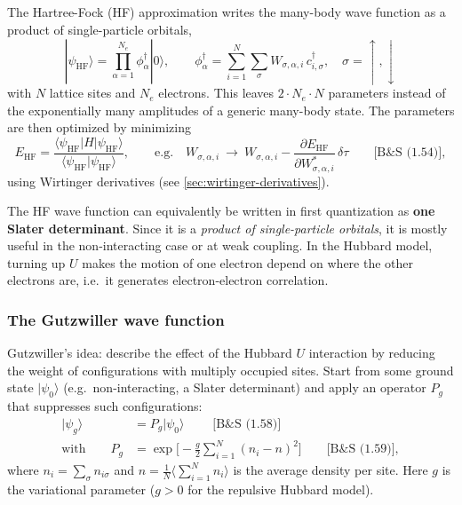 \documentclass[../../main.tex]{subfiles}
\begin{document}
The Hartree-Fock (HF) approximation writes the many-body wave function as a
product of single-particle orbitals,
\begin{equation}
\boxed{\;
|\psi_{\mathrm{HF}}\rangle=\prod_{\alpha=1}^{N_e}\phi^\dagger_\alpha|0\rangle,
\qquad
\phi^\dagger_\alpha=\sum_{i=1}^{N}\sum_\sigma W_{\sigma,\alpha,i}\,c^\dagger_{i,\sigma},
\quad \sigma=\uparrow,\downarrow \;}
\end{equation}
with $N$ lattice sites and $N_e$ electrons. This leaves
$2\cdot N_e\cdot N$ parameters instead of the exponentially many amplitudes of a
generic many-body state.
The parameters are then optimized by minimizing
\begin{equation}
E_{\mathrm{HF}}=\frac{\langle\psi_{\mathrm{HF}}|H|\psi_{\mathrm{HF}}\rangle}
{\langle\psi_{\mathrm{HF}}|\psi_{\mathrm{HF}}\rangle},
\qquad\text{e.g.}\quad
W_{\sigma,\alpha,i}\ \to\ W_{\sigma,\alpha,i}
-\frac{\partial E_{\mathrm{HF}}}{\partial W^*_{\sigma,\alpha,i}}\,\delta\tau
\qquad\text{[B\&S~(1.54)]},
\end{equation}
using Wirtinger derivatives (see \cref{sec:wirtinger-derivatives}).

The HF wave function can equivalently be written in first quantization as
\textbf{one Slater determinant}. Since it is a \emph{product of single-particle
orbitals}, it is mostly useful in the non-interacting case or at weak coupling.
In the Hubbard model, turning up $U$ makes the motion of one electron depend on
where the other electrons are, i.e.\ it generates electron-electron correlation.

\subsubsection{The Gutzwiller wave function}

Gutzwiller's idea: describe the effect of the Hubbard $U$ interaction by reducing
the weight of configurations with multiply occupied sites. Start from some ground
state $|\psi_0\rangle$ (e.g.\ non-interacting, a Slater determinant) and apply an
operator $P_g$ that suppresses such configurations:
\begin{align}
|\psi_g\rangle &= P_g|\psi_0\rangle\;  \qquad \text{[B\&S~(1.58)]} \\
\text{with} \qquad P_g &=\exp\Big[-\frac{g}{2}\sum_{i=1}^{N}(n_i-n)^2\Big]
\qquad\text{[B\&S~(1.59)]},
\end{align}
where $n_i=\sum_\sigma n_{i\sigma}$ and
$n=\frac{1}{N}\big\langle\sum_{i=1}^{N} n_i\big\rangle$ is the average density per
site. Here $g$ is the variational parameter ($g>0$ for the repulsive Hubbard
model).
\end{document}
